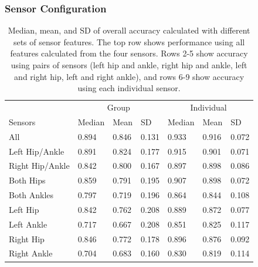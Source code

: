 \documentclass[
  man]{apa6}
\begin{document}
\hypertarget{sensor-configuration}{%
\subsubsection{Sensor Configuration}\label{sensor-configuration}}

\begin{table}[tbp]

\begin{center}
\begin{threeparttable}

\caption{\label{tab:metrics-reduce}Median, mean, and SD of overall accuracy calculated with different sets of sensor features. The top row shows performance using all features calculated from the four sensors. Rows 2-5 show accuracy using pairs of sensors (left hip and ankle, right hip and ankle, left and right hip, left and right ankle), and rows 6-9 show accuracy using each individual sensor.}

\begin{tabular}{lllllll}
\toprule
 & \multicolumn{3}{c}{Group} & \multicolumn{3}{c}{Individual} \\
\cmidrule(r){2-4} \cmidrule(r){5-7}
Sensors & Median & Mean & SD & Median & Mean & SD\\
\midrule
All & 0.894 & 0.846 & 0.131 & 0.933 & 0.916 & 0.072\\ \midrule
Left Hip/Ankle & 0.891 & 0.824 & 0.177 & 0.915 & 0.901 & 0.071\\
Right Hip/Ankle & 0.842 & 0.800 & 0.167 & 0.897 & 0.898 & 0.086\\
Both Hips & 0.859 & 0.791 & 0.195 & 0.907 & 0.898 & 0.072\\
Both Ankles & 0.797 & 0.719 & 0.196 & 0.864 & 0.844 & 0.108\\ \midrule
Left Hip & 0.842 & 0.762 & 0.208 & 0.889 & 0.872 & 0.077\\
Left Ankle & 0.717 & 0.667 & 0.208 & 0.851 & 0.825 & 0.117\\
Right Hip & 0.846 & 0.772 & 0.178 & 0.896 & 0.876 & 0.092\\
Right Ankle & 0.704 & 0.683 & 0.160 & 0.830 & 0.819 & 0.114\\
\bottomrule
\end{tabular}

\end{threeparttable}
\end{center}

\end{table}
\end{document}
